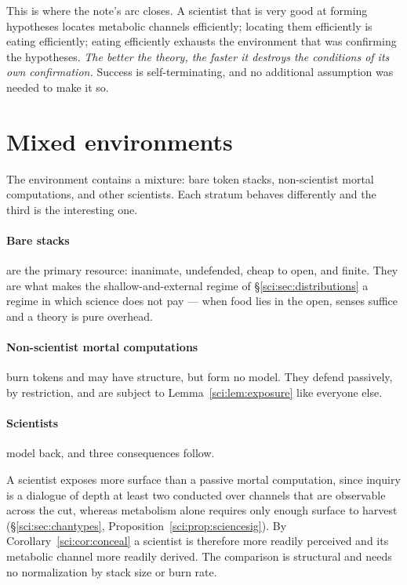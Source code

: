 This is where the note's arc closes. A scientist that is very good at forming hypotheses locates
metabolic channels efficiently; locating them efficiently is eating efficiently; eating efficiently
exhausts the environment that was confirming the hypotheses. \emph{The better the theory, the faster
it destroys the conditions of its own confirmation.} Success is self-terminating, and no additional
assumption was needed to make it so.

\section{Mixed environments}\label{sci:S10}
\label{sci:sec:mixed}

The environment contains a mixture: bare token stacks, non-scientist mortal computations, and other
scientists. Each stratum behaves differently and the third is the interesting one.

\paragraph{Bare stacks} are the primary resource: inanimate, undefended, cheap to open, and finite.
They are what makes the shallow-and-external regime of \S\ref{sci:sec:distributions} a regime in which
science does not pay --- when food lies in the open, senses suffice and a theory is pure overhead.

\paragraph{Non-scientist mortal computations} burn tokens and may have structure, but form no model.
They defend passively, by restriction, and are subject to Lemma~\ref{sci:lem:exposure} like everyone else.

\paragraph{Scientists} model back, and three consequences follow.

\begin{proposition}
\label{sci:prop:preferredprey}
A scientist exposes more surface than a passive mortal computation, since inquiry is a dialogue of
depth at least two conducted over channels that are observable across the cut, whereas metabolism
alone requires only enough surface to harvest (\S\ref{sci:sec:chantypes},
Proposition~\ref{sci:prop:sciencesig}). By Corollary~\ref{sci:cor:conceal} a scientist is therefore more
readily perceived and its metabolic channel more readily derived. The comparison is structural and
needs no normalization by stack size or burn rate.
\end{proposition}

